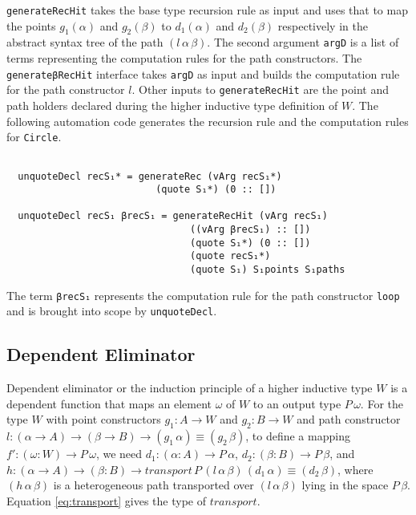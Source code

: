 \documentclass[sigplan,10pt]{acmart}
\begin{document}
{\tt generateRecHit} takes the base type recursion rule as input and uses that to map the points $g_1 (\alpha)$ and $g_2 (\beta)$ to $d_1 (\alpha)$ and $d_2 (\beta)$ respectively in the abstract syntax tree of the path $(l \, \alpha \, \beta)$. The second argument {\tt argD} is a list of terms representing the computation rules for the path constructors. The {\tt generateβRecHit} interface takes {\tt argD} as input and builds the computation rule for the path constructor $l$. Other inputs to {\tt generateRecHit} are the point and path holders declared during the higher inductive type definition of $W$. The following automation code generates the recursion rule and the computation rules for {\tt Circle}.

\begin{center}
\begingroup
\fontsize{8pt}{9pt}\selectfont
\begin{Verbatim}

  unquoteDecl recS₁* = generateRec (vArg recS₁*)
                          (quote S₁*) (0 :: [])

  unquoteDecl recS₁ βrecS₁ = generateRecHit (vArg recS₁) 
                                ((vArg βrecS₁) :: [])
                                (quote S₁*) (0 :: [])
                                (quote recS₁*)
                                (quote S₁) S₁points S₁paths

\end{Verbatim}
\endgroup
\end{center}

The term {\tt βrecS₁} represents the computation rule for the path constructor {\tt loop} and is brought into scope by {\tt unquoteDecl}.

\subsection{Dependent Eliminator}
\label{sec:sec4.3}

Dependent eliminator or the induction principle of a higher inductive type $W$ is a dependent function that maps an element $\omega$ of $W$ to an output type $P \, \omega$. For the type $W$ with point constructors $g_1 : A \rightarrow W$ and $g_2 : B \rightarrow W$ and path constructor $l : (\alpha \rightarrow A) \rightarrow (\beta \rightarrow B) \rightarrow (g_1 \, \alpha) \equiv (g_2 \, \beta)$, to define a mapping $f' : (\omega : W) \rightarrow P \, \omega$, we need $d_1 : (\alpha : A) \rightarrow P \, \alpha$, $d_2 : (\beta : B) \rightarrow P \, \beta$, and $h : (\alpha \rightarrow A) \rightarrow (\beta : B) \rightarrow transport \, P \, (l \, \alpha \, \beta) \, (d_1 \, \alpha) \equiv (d_2 \, \beta)$, where $(h \, \alpha \, \beta)$ is a heterogeneous path transported over $(l \, \alpha \, \beta)$ lying in the space $P \, \beta$. Equation \eqref{eq:transport} gives the type of $transport$.
\end{document}
